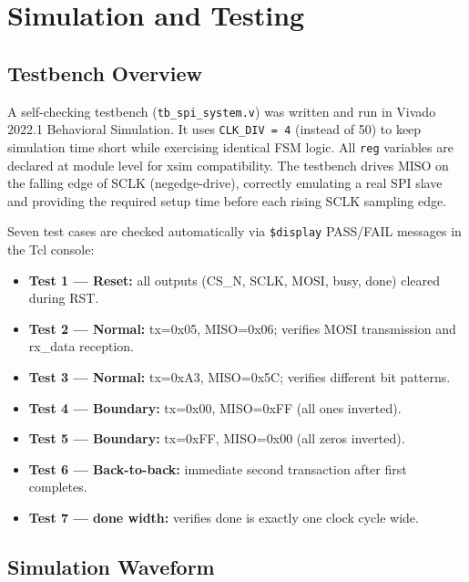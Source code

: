 \documentclass[12pt,a4paper]{report}
\begin{document}
\chapter{Simulation and Testing}

\section{Testbench Overview}

A self-checking testbench (\texttt{tb\_spi\_system.v}) was written and run in Vivado 2022.1 Behavioral Simulation. It uses \texttt{CLK\_DIV = 4} (instead of 50) to keep simulation time short while exercising identical FSM logic. All \texttt{reg} variables are declared at module level for xsim compatibility. The testbench drives MISO on the falling edge of SCLK (negedge-drive), correctly emulating a real SPI slave and providing the required setup time before each rising SCLK sampling edge.

Seven test cases are checked automatically via \texttt{\$display} PASS/FAIL messages in the Tcl console:

\begin{itemize}[leftmargin=1.5em]
  \item \textbf{Test 1 --- Reset:} all outputs (CS\_N, SCLK, MOSI, busy, done) cleared during RST.
  \item \textbf{Test 2 --- Normal:} tx=0x05, MISO=0x06; verifies MOSI transmission and rx\_data reception.
  \item \textbf{Test 3 --- Normal:} tx=0xA3, MISO=0x5C; verifies different bit patterns.
  \item \textbf{Test 4 --- Boundary:} tx=0x00, MISO=0xFF (all ones inverted).
  \item \textbf{Test 5 --- Boundary:} tx=0xFF, MISO=0x00 (all zeros inverted).
  \item \textbf{Test 6 --- Back-to-back:} immediate second transaction after first completes.
  \item \textbf{Test 7 --- done width:} verifies done is exactly one clock cycle wide.
\end{itemize}

\section{Simulation Waveform}
\end{document}
